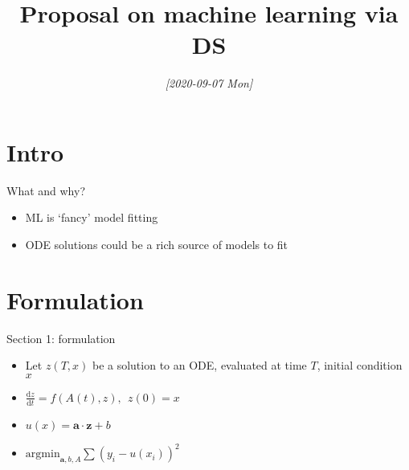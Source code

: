 \documentclass[presentation]{beamer}
\date{\textit{[2020-09-07 Mon]}}
\title{Proposal on machine learning via DS}
\begin{document}
\maketitle

\section{Intro}
\label{sec:org85e9ae1}
\begin{frame}[label={sec:org46b4937}]{What and why?}
\begin{itemize}
\item ML is `fancy' model fitting
\end{itemize}

\vfill
\begin{itemize}
\item ODE solutions could be a rich source of models to fit
\end{itemize}
\end{frame}

\section{Formulation}
\label{sec:org0773ed5}
\begin{frame}[<+->][label={sec:org37c23ae}]{Section 1: formulation}
\begin{itemize}
\item Let \(z(T,x)\) be a solution to an ODE, evaluated at time \(T\), initial condition \(x\)
\end{itemize}
\vfill
\begin{itemize}
\item \(\frac{\mathrm{d}z}{\mathrm{d}t} = f(A(t), z),~~z(0)=x\)
\end{itemize}
\vfill
\begin{itemize}
\item \(u(x) = \mathbf{a}\cdot \mathbf{z} + b\)
\end{itemize}
\vfill
\begin{itemize}
\item \(\mathrm{argmin}_{\mathbf{a},b,A} \sum(y_i - u(x_i))^2\)
\end{itemize}
\end{frame}
\end{document}
